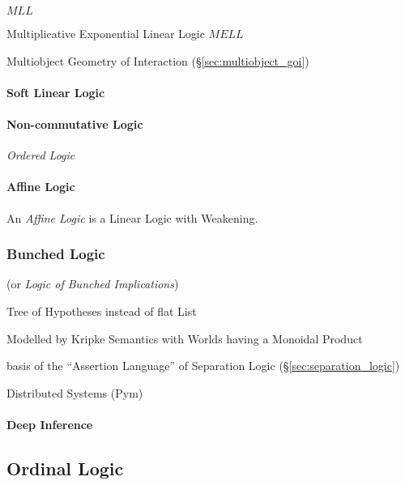 $MLL$

Multiplicative Exponential Linear Logic $MELL$

Multiobject Geometry of Interaction (\S\ref{sec:multiobject_goi})



\paragraph{Soft Linear Logic}\label{sec:soft_linear_logic}\hfill

\paragraph{Non-commutative Logic}\label{sec:noncommutative_logic}\hfill

\emph{Ordered Logic}



\paragraph{Affine Logic}\label{sec:affine_logic}\hfill

An \emph{Affine Logic} is a Linear Logic with Weakening.



\subsubsection{Bunched Logic}\label{sec:bunched_logic}

(or \emph{Logic of Bunched Implications})

Tree of Hypotheses instead of flat List

Modelled by Kripke Semantics with Worlds having a Monoidal Product

basis of the ``Assertion Language'' of Separation Logic
(\S\ref{sec:separation_logic})

Distributed Systems (Pym)



\paragraph{Deep Inference}\label{sec:deep_inference}\hfill



\subsection{Ordinal Logic}\label{sec:ordinal_logic}

